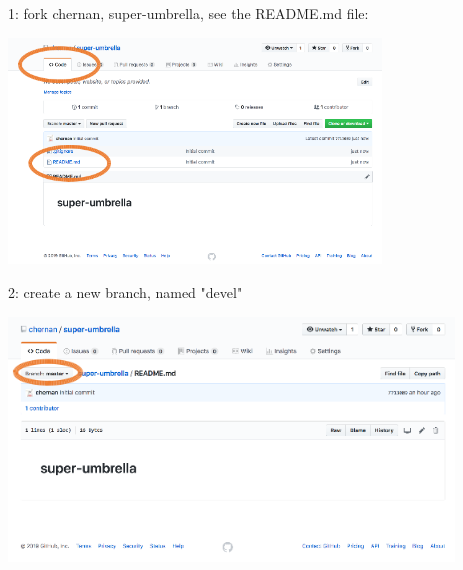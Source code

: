 \begin{frame}{ }
\begin{exampleblock}{1: fork chernan, super-umbrella, see the README.md file:}
    \begin{center}
    \includegraphics[height=6cm]{05_history/Images/FAIR_githubTP_readme.png}
    \end{center}
\end{exampleblock}
\end{frame}
\begin{frame}{ }
\begin{exampleblock}{2: create a new branch, named "devel"}
    \begin{center}
    \includegraphics[height=6.5cm]{05_history/Images/FAIR_githubTP_develBranch.png}
    \end{center}
\end{exampleblock}
\end{frame}


